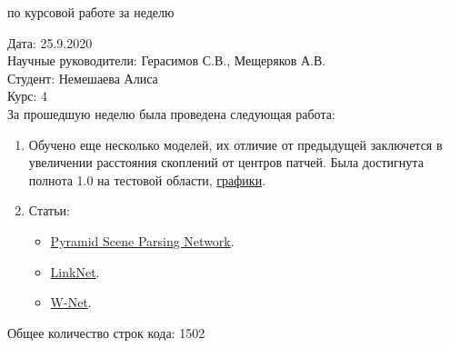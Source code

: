 \documentclass{article}
\begin{document}
\begin{center}{ по курсовой работе за неделю\\}\end{center}
Дата: 25.9.2020\\
Научные руководители: Герасимов С.В., Мещеряков А.В.\\
Студент: Немешаева Алиса\\
Курс: 4\\

\renewcommand{\labelitemi}{$\blacksquare$}
\renewcommand\labelitemii{$\square$}
За прошедшую неделю была проведена следующая работа:\\
\begin{enumerate}
    \item Обучено еще несколько моделей, их отличие от предыдущей заключется в увеличении расстояния 
        скоплений от центров патчей. Была достигнута полнота 1.0 на тестовой области, 
        \hyperlink{https://github.com/rt2122/data-segmentation-2/blob/master/Planck\_Unet/scan\_planck\_z\_f8\_d0.8.ipynb}{графики}.\\
    \item Статьи:
        \begin{itemize}
            \item \hyperlink{https://arxiv.org/pdf/1612.01105.pdf}{Pyramid Scene Parsing Network}.\\
            \item \hyperlink{https://arxiv.org/pdf/1707.03718.pdf}{LinkNet}.\\
            \item \hyperlink{https://arxiv.org/pdf/2009.01907.pdf}{W-Net}.\\
        \end{itemize}
\end{enumerate}

Общее количество строк кода: 1502\\
\end{document}
